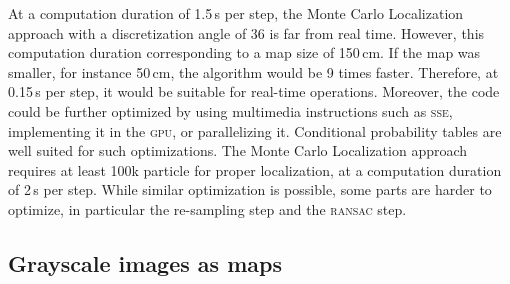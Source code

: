 \documentclass[letterpaper, 10pt, conference]{ieeeconf}
\begin{document}
At a computation duration of 1.5\,s per step, the Monte Carlo Localization approach with a discretization angle of 36 is far from real time.
However, this computation duration corresponding to a map size of 150\,cm.
If the map was smaller, for instance 50\,cm, the algorithm would be 9 times faster.
Therefore, at 0.15\,s per step, it would be suitable for real-time operations.
Moreover, the code could be further optimized by using multimedia instructions such as \textsc{sse}, implementing it in the \textsc{gpu}, or parallelizing it.
Conditional probability tables are well suited for such optimizations.
The Monte Carlo Localization approach requires at least 100k particle for proper localization, at a computation duration of 2\,s per step.
While similar optimization is possible, some parts are harder to optimize, in particular the re-sampling step and the \textsc{ransac} step.

\subsection{Grayscale images as maps}
\end{document}
